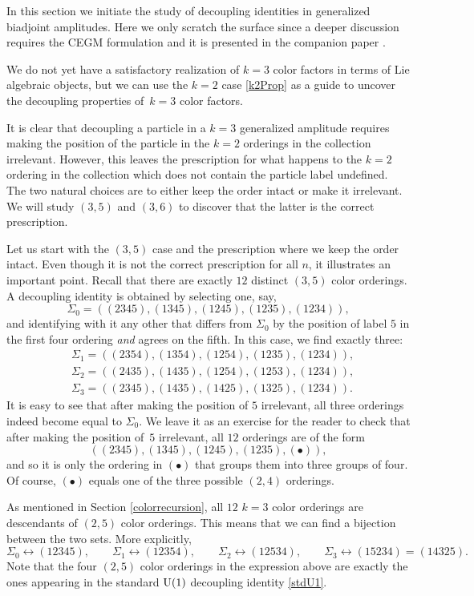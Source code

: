 \documentclass[pdftex]{sigma}
\theoremstyle{definition}
\numberwithin{equation}{section}
\begin{document}
In this section we initiate the study of decoupling identities in generalized biadjoint amplitudes. Here we only scratch the surface since a deeper discussion requires the CEGM formulation and it is presented in the companion paper \cite{Cachazo:2023ltw}.

We do not yet have a satisfactory realization of $k=3$ color factors in terms of Lie algebraic objects, but we can use the $k=2$ case \eqref{k2Prop} as a guide to uncover the decoupling properties of~$k=3$ color factors.

It is clear that decoupling a particle in a $k=3$ generalized amplitude requires making the position of the particle in the $k=2$ orderings in the collection irrelevant. However, this leaves the prescription for what happens to the $k=2$ ordering in the collection which does not contain the particle label undefined. The two natural choices are to either keep the order intact or make it irrelevant. We will study $(3,5)$ and $(3,6)$ to discover that the latter is the correct prescription.

Let us start with the $(3,5)$ case and the prescription where we keep the order intact. Even though it is not the correct prescription for all $n$, it illustrates an important point. Recall that there are exactly $12$ distinct $(3,5)$ color orderings. A decoupling identity is obtained by selecting one, say,
\[
\Sigma_0 = ((2345),(1345),(1245),(1235),(1234)),
\]
and identifying with it any other that differs from $\Sigma_0$ by the position of label $5$ in the first four ordering {\it and} agrees on the fifth. In this case, we find exactly three:
\begin{align*}
& \Sigma_1 = ((2 3 5 4), (1 3 5 4), (1 2 5 4), (1 2 3 5), (1
 2 3 4)) ,\\
& \Sigma_2 = ((2 4 3 5), (1 4 3 5), (1 2 5 4), (1 2 5
 3), (1 2 3 4)) , \\
& \Sigma_3 = ((2 34 5), (1 4 3 5), (1 4 2 5), (1
 3 2 5), (1 2 3 4)) .
\end{align*}
It is easy to see that after making the position of $5$ irrelevant, all three orderings indeed become equal to $\Sigma_0$. We leave it as an exercise for the reader to check that after making the position of~$5$ irrelevant, all $12$ orderings are of the form
\[
((2345),(1345),(1245),(1235),(\bullet )),
\]
and so it is only the ordering in $(\bullet)$ that groups them into three groups of four. Of course, $(\bullet)$ equals one of the three possible $(2,4)$ orderings.

As mentioned in Section \ref{colorrecursion}, all $12$ $k=3$ color orderings are descendants of $(2,5)$ color orderings. This means that we can find a bijection between the two sets. More explicitly,
\[
\Sigma_0 \leftrightarrow (12345), \qquad \Sigma_1 \leftrightarrow (12354), \qquad \Sigma_2 \leftrightarrow (12534), \qquad \Sigma_3 \leftrightarrow (15234)=(14325).
\]
Note that the four $(2,5)$ color orderings in the expression above are exactly the ones appearing in the standard ${\rm U}(1)$ decoupling identity \eqref{stdU1}.
\end{document}
